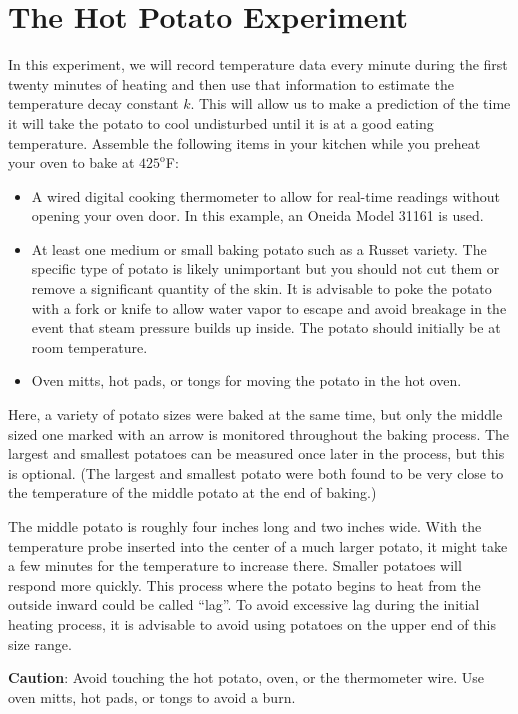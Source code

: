 \documentclass{ximera}
\begin{document}
\section*{The Hot Potato Experiment}
In this experiment, we will record temperature data every minute during the first twenty minutes of heating and then use that information to estimate the temperature decay constant $k$.  This will allow us to make a prediction of the time it will take the potato to cool undisturbed until it is at a good eating temperature.
Assemble the following items in your kitchen while you preheat your oven to bake at $425^{\text{o}}$F:

\begin{itemize}
\item A wired digital cooking thermometer to allow for real-time readings without opening your oven door. In this example, an Oneida Model 31161 is used.
\item At least one medium or small baking potato such as a Russet variety. The specific type of potato is likely unimportant but you should not cut them or remove a significant quantity of the skin.  It is advisable to poke the potato with a fork or knife to allow water vapor to escape and avoid breakage in the event that steam pressure builds up inside.  The potato should initially be at room temperature.
\item Oven mitts, hot pads, or tongs for moving the potato in the hot oven.
\end{itemize}

Here, a variety of potato sizes were baked at the same time, but only the middle sized one marked with an arrow is monitored throughout the baking process.  The largest and smallest potatoes can be measured once later in the process, but this is optional.  (The largest and smallest potato were both found to be very close to the temperature of the middle potato at the end of baking.)
 
The middle potato is roughly four inches long and two inches wide.  With the temperature probe inserted into the center of a much larger potato, it might take a few minutes for the temperature to increase there.  Smaller potatoes will respond more quickly.  This process where the potato begins to heat from the outside inward could be called ``lag''.  To avoid excessive lag during the initial heating process, it is advisable to avoid using potatoes on the upper end of this size range.    

{\large \textbf{Caution}: Avoid touching the hot potato, oven, or the thermometer wire.  Use oven mitts, hot pads, or tongs to avoid a burn.}
\end{document}
